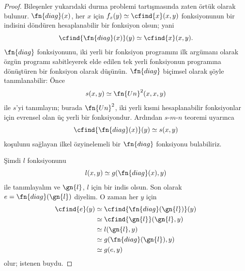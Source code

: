 \documentclass[../../../include/open-logic-section]{subfiles}
\begin{document}
\begin{proof}
Bileşenler yukarıdaki durma problemi tartışmasında zaten örtük olarak
bulunur. $\fn{diag}(x)$, her $x$ için
$f_x(y)\simeq\cfind{x}(x,y)$ fonksiyonunun bir indisini döndüren
hesaplanabilir bir fonksiyon olsun; yani
\[
  \cfind{\fn{diag}(x)}(y)\simeq\cfind{x}(x,y).
\]
$\fn{diag}$ fonksiyonunu, iki yerli bir fonksiyon programını ilk argümanı
olarak özgün programı sabitleyerek elde edilen tek yerli fonksiyonun
programına dönüştüren bir fonksiyon olarak düşünün. $\fn{diag}$ biçimsel
olarak şöyle tanımlanabilir: Önce
\[
  s(x,y)\simeq\fn{Un}^2(x,x,y)
\]
ile $s$'yi tanımlayın; burada $\fn{Un}^2$, iki yerli kısmi hesaplanabilir
fonksiyonlar için evrensel olan üç yerli bir fonksiyondur. Ardından
$s$-$m$-$n$ teoremi uyarınca
\[
  \cfind{\fn{diag}(x)}(y)\simeq s(x,y)
\]
koşulunu sağlayan ilkel özyinelemeli bir $\fn{diag}$ fonksiyonu bulabiliriz.

Şimdi $l$ fonksiyonunu
\[
  l(x,y)\simeq g(\fn{diag}(x),y)
\]
ile tanımlayalım ve $\gn{l}$, $l$ için bir indis olsun. Son olarak
$e=\fn{diag}(\gn{l})$ diyelim. O zaman her $y$ için
\begin{align*}
  \cfind{e}(y) & \simeq\cfind{\fn{diag}(\gn{l})}(y)\\
  & \simeq\cfind{\gn{l}}(\gn{l},y)\\
  & \simeq l(\gn{l},y)\\
  & \simeq g(\fn{diag}(\gn{l}),y)\\
  & \simeq g(e,y)
\end{align*}
olur; istenen buydu.
\end{proof}
\end{document}
